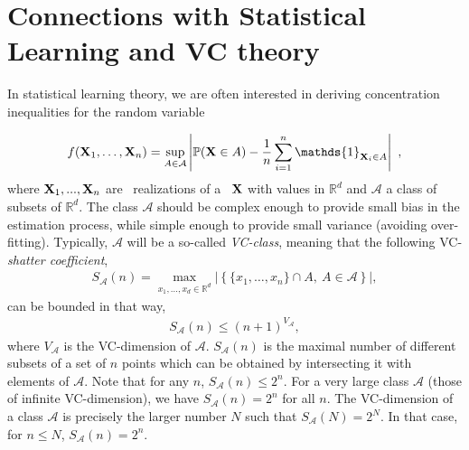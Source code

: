 \section{Connections with Statistical Learning and VC theory}
In statistical learning theory, we are often interested in deriving concentration inequalities for the random variable 

\begin{align}
\label{def_F}
f(\mb X_1,\ldots,\mb X_n)= \sup_{A \in \mathcal{A}} \left | \mathbb{P}(\mb X \in A) - \frac{1}{n} \sum_{i=1}^n \mathds{1}_{\mb X_i \in A} \right|~,
\end{align}
where $\mathbf X_1,...,\mathbf X_n$ are \iid~realizations of a \rv~$\mathbf X$ with values in $\mathbb{R}^d$ and $\mathcal{A}$ a class of subsets of $\mathbb{R}^d$.
The class $\mathcal{A}$ should be complex enough to provide small bias in the estimation process, while simple enough to provide small variance (avoiding over-fitting). Typically, $\mathcal{A}$ will be a so-called \emph{VC-class}, meaning that the following VC-\emph{shatter coefficient},
\begin{align}
S_{\mathcal{A}}(n) = \max_{ x_1,\ldots,x_d \in \mathbb{R}^d}  \left| \left\{ \{x_1,\ldots, x_n\} \cap A,~A\in \mathcal{A} \right\} \right|,
\end{align}
can be bounded in that way,
\begin{align}
S_{\mathcal{A}}(n) \le (n+1)^{V_\mathcal{A}},
\end{align}
where $V_\mathcal{A}$ is the VC-dimension of $\mathcal{A}$. 
$S_{\mathcal{A}}(n)$ is the maximal number of different subsets of a set of $n$ points which can be obtained by intersecting it with elements of $\mathcal{A}$. Note that for any $n$, $S_{\mathcal{A}}(n) \le 2^n$. For a very large class $\mathcal{A}$ (those of infinite VC-dimension), we have $S_{\mathcal{A}}(n) = 2^n$ for all $n$. The VC-dimension of a class $\mathcal{A}$ is precisely the larger number $N$ such that $S_{\mathcal{A}}(N) = 2^N$. In that case, for $n \le N$, $S_{\mathcal{A}}(n) = 2^n$.

